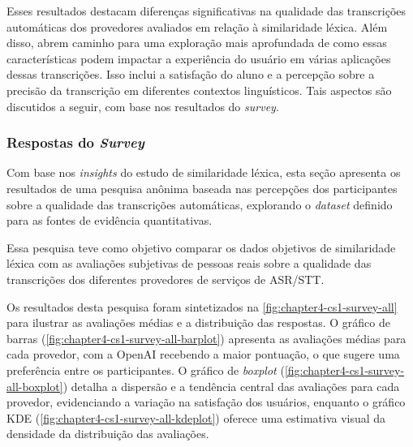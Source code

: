 Esses resultados destacam diferenças significativas na qualidade das transcrições automáticas dos provedores avaliados em relação à similaridade léxica. Além disso, abrem caminho para uma exploração mais aprofundada de como essas características podem impactar a experiência do usuário em várias aplicações dessas transcrições. Isso inclui a satisfação do aluno e a percepção sobre a precisão da transcrição em diferentes contextos linguísticos. Tais aspectos são discutidos a seguir, com base nos resultados do \textit{survey}.

\subsubsection{Respostas do \textit{Survey}}

Com base nos \textit{insights} do estudo de similaridade léxica, esta seção apresenta os resultados de uma pesquisa anônima baseada nas percepções dos participantes sobre a qualidade das transcrições automáticas, explorando o \textit{dataset} definido para as fontes de evidência quantitativas. 

Essa pesquisa teve como objetivo comparar os dados objetivos de similaridade léxica com as avaliações subjetivas de pessoas reais sobre a qualidade das transcrições dos diferentes provedores de serviços de ASR/STT.

Os resultados desta pesquisa foram sintetizados na \autoref{fig:chapter4-cs1-survey-all} para ilustrar as avaliações médias e a distribuição das respostas. O gráfico de barras (\autoref{fig:chapter4-cs1-survey-all-barplot}) apresenta as avaliações médias para cada provedor, com a OpenAI recebendo a maior pontuação, o que sugere uma preferência entre os participantes. O gráfico de \textit{boxplot} (\autoref{fig:chapter4-cs1-survey-all-boxplot}) detalha a dispersão e a tendência central das avaliações para cada provedor, evidenciando a variação na satisfação dos usuários, enquanto o gráfico KDE (\autoref{fig:chapter4-cs1-survey-all-kdeplot}) oferece uma estimativa visual da densidade da distribuição das avaliações.

